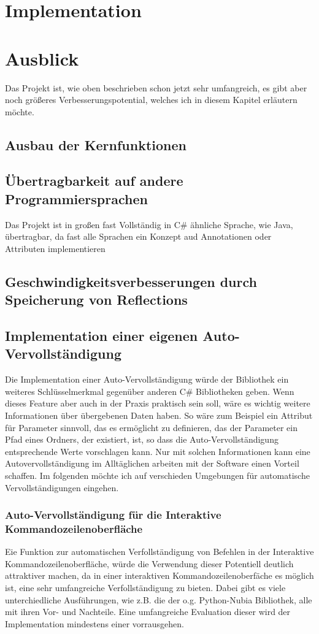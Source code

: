 \documentclass[a4paper,11pt,titlepage,ngerman]{article}
\begin{document}
\begin{sloppypar}
  \section{Implementation}\label{sec:Content}
  

  \section{Ausblick}\label{sec:Future}
  Das Projekt ist, wie oben beschrieben schon jetzt sehr umfangreich, es gibt aber noch grö\ss eres Verbesserungspotential, welches ich in diesem Kapitel erl\"autern m\"ochte.
  \subsection{Ausbau der Kernfunktionen}\label{subsec:MoreFunctions}
  \subsection{Übertragbarkeit auf andere Programmiersprachen}\label{subsec:PortabilityToOtherLangs}
  Das Projekt ist in gro\ss en fast Vollständig in C\# ähnliche Sprache, wie Java, übertragbar, da fast alle Sprachen ein Konzept aud Annotationen oder Attributen implementieren 
  \subsection{Geschwindigkeitsverbesserungen durch Speicherung von Reflections}\label{subsec:StoringReflections}
  \subsection{Implementation einer eigenen Auto-Vervollständigung}\label{subsec:Autocomplete}
  Die Implementation einer Auto-Vervollständigung würde der Bibliothek ein weiteres Schlüsselmerkmal gegenüber anderen C\# Bibliotheken geben.
  Wenn dieses Feature aber auch in der Praxis praktisch sein soll, wäre es wichtig weitere Informationen über übergebenen Daten haben.
  So wäre zum Beispiel ein Attribut für Parameter sinnvoll, das es ermöglicht zu definieren, das der Parameter ein Pfad eines Ordners, 
  der existiert, ist, so dass die Auto-Vervollständigung entsprechende Werte vorschlagen kann.
  Nur mit solchen Informationen kann eine Autovervollständigung im Alltäglichen arbeiten mit der Software einen Vorteil schaffen.
  Im folgenden möchte ich auf verschieden Umgebungen für automatische Vervollständigungen eingehen.
  \subsubsection{Auto-Vervollständigung für die Interaktive Kommandozeilenoberfläche}
  Eie Funktion zur automatischen Verfollständigung von Befehlen in der Interaktive Kommandozeilenoberfläche, würde die Verwendung dieser Potentiell deutlich attraktiver machen, 
  da in einer interaktiven Kommandozeilenoberfäche es möglich ist, eine sehr umfangreiche Verfollständigung zu bieten.
  Dabei gibt es viele unterchiedliche Ausführungen, wie z.B. die der o.g. Python-Nubia Bibliothek, alle mit ihren Vor- und Nachteile.
  Eine umfangreiche Evaluation dieser wird der Implementation mindestens einer vorrausgehen. 

\end{sloppypar}
\end{document}

